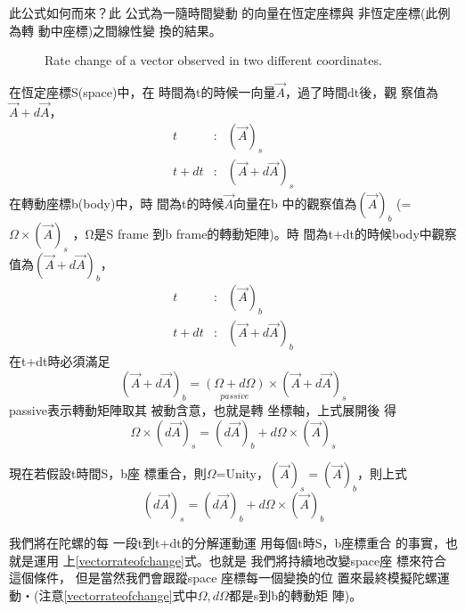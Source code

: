 \documentclass[12pt,a4paper]{article}
\begin{document}
此公式如何而來？此%
公式為一隨時間變動%
的向量在恆定座標與%
非恆定座標(此例為轉%
動中座標)之間線性變%
換的結果。

\begin{figure}[th]
\caption{Rate change of a vector observed in two different coordinates.}
\begin{center}
\end{center}
\end{figure}
\bigskip

在恆定座標S(space)中，在%
時間為t的時候一向量$%
\vec{A}$，過了時間dt後，觀%
察值為$\vec{A}+d\vec{A}$，%
\begin{eqnarray}
t &:&(\vec{A})_{s} \\
t+dt &:&\left( \vec{A}+d\vec{A}\right) _{s}
\end{eqnarray}%
在轉動座標b(body)中，時%
間為t的時候$\vec{A}$向量在b%
中的觀察值為$\left( \vec{A}\right) _{b}$%
(= $\Omega \times \left( \vec{A}\right) _{s}$ ，Ω是S frame%
到b frame的轉動矩陣)。時%
間為t+dt的時候body中觀察%
值為$\left( \vec{A}+d\vec{A}\right) _{b}$，%
\begin{eqnarray}
t &:&\left( \vec{A}\right) _{b} \\
t+dt &:&\left( \vec{A}+d\vec{A}\right) _{b}
\end{eqnarray}%
在t+dt時必須滿足%
\begin{equation}
\left( \vec{A}+d\vec{A}\right) _{b}=\underset{passive}{\left( \Omega
+d\Omega \right) }\times \left( \vec{A}+d\vec{A}\right) _{s}
\label{finiterotmatrix}
\end{equation}%
passive表示轉動矩陣取其%
被動含意，也就是轉%
坐標軸，上式展開後%
得%
\begin{equation}
\Omega \times \left( d\vec{A}\right) _{s}=\left( d\vec{A}\right)
_{b}+d\Omega \times \left( \vec{A}\right) _{s}
\end{equation}

現在若假設t時間S，b座%
標重合，則$\Omega $=Unity，$\left( \vec{A%
}\right) _{s}=\left( \vec{A}\right) _{b}$，則上式%
\begin{equation}
\left( d\vec{A}\right) _{s}=\left( d\vec{A}\right) _{b}+d\Omega \times
\left( \vec{A}\right) _{b}  \label{vectorrateofchange}
\end{equation}

\bigskip 我們將在陀螺的每%
一段t到t+dt的分解運動運%
用每個t時S，b座標重合%
的事實，也就是運用%
上\ref{vectorrateofchange}式。也就是%
我們將持續地改變space座%
標來符合這個條件，%
但是當然我們會跟蹤space%
座標每一個變換的位%
置來最終模擬陀螺運%
動‧(注意\ref{vectorrateofchange}式中$%
\Omega ,d\Omega $都是s到b的轉動矩%
陣)。
\end{document}

